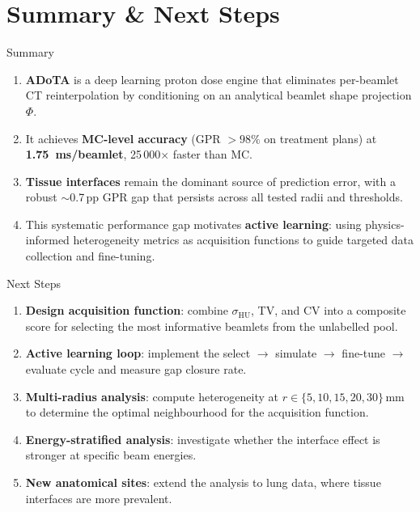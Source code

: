 \documentclass[aspectratio=169, 10pt]{beamer}
\begin{document}
\section{Summary \& Next Steps}

\begin{frame}{Summary}
  \begin{enumerate}\setlength{\itemsep}{4pt}
    \item \textbf{ADoTA} is a deep learning proton dose engine that
          eliminates per-beamlet CT reinterpolation by conditioning
          on an analytical beamlet shape projection $\Phi$.
    \item It achieves \textbf{MC-level accuracy}
          (GPR $> 98\%$ on treatment plans) at
          \textbf{\SI{1.75}{ms}/beamlet}, 25\,000$\times$ faster
          than MC.
    \item \textbf{Tissue interfaces} remain the dominant source of
          prediction error, with a robust $\sim$0.7\,pp GPR gap
          that persists across all tested radii and thresholds.
    \item This systematic performance gap motivates
          \textbf{active learning}: using physics-informed
          heterogeneity metrics as
          acquisition functions to guide targeted data collection
          and fine-tuning.
  \end{enumerate}
\end{frame}

\begin{frame}{Next Steps}
  \begin{enumerate}\setlength{\itemsep}{5pt}
    \item \textbf{Design acquisition function}: combine
          $\sigma_{\text{HU}}$, TV, and CV into a composite score
          for selecting the most informative beamlets from the
          unlabelled pool.
    \item \textbf{Active learning loop}: implement the
          select $\rightarrow$ simulate $\rightarrow$ fine-tune
          $\rightarrow$ evaluate cycle and measure gap closure rate.
    \item \textbf{Multi-radius analysis}: compute heterogeneity
          at $r \in \{5, 10, 15, 20, 30\}$\,mm to determine the
          optimal neighbourhood for the acquisition function.
    \item \textbf{Energy-stratified analysis}: investigate whether
          the interface effect is stronger at specific beam energies.
    \item \textbf{New anatomical sites}: extend the analysis to
          lung data, where tissue interfaces are more prevalent.
  \end{enumerate}
\end{frame}
\end{document}
